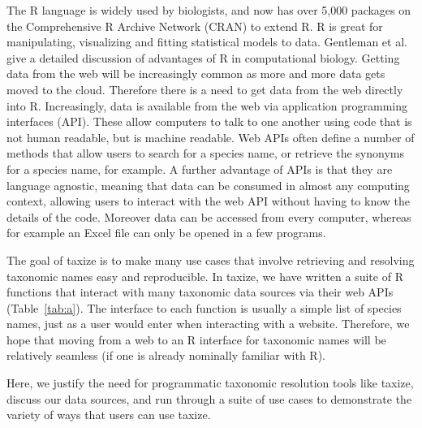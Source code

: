 \documentclass[10pt,a4paper,twocolumn]{article}\usepackage[]{graphicx}\usepackage[]{color}
\begin{document}
The R language is widely used by biologists, and now has over 5,000 packages on the Comprehensive R Archive Network (CRAN) to extend R. R is great for manipulating, visualizing and fitting statistical models to data. Gentleman et al. \cite{gentleman_bioconductor:_2004} give a detailed discussion of advantages of R in computational biology. Getting data from the web will be increasingly common as more and more data gets moved to the cloud. Therefore there is a need to get data from the web directly into R. Increasingly, data is available from the web via application programming interfaces (API). These allow computers to talk to one another using code that is not human readable, but is machine readable. Web APIs often define a number of methods that allow users to search for a species name, or retrieve the synonyms for a species name, for example. A further advantage of APIs is that they are language agnostic, meaning that data can be consumed in almost any computing context, allowing users to interact with the web API without having to know the details of the code. Moreover data can be accessed from every computer, whereas for example an Excel file can only be opened in a few programs. 

The goal of taxize is to make many use cases that involve retrieving and resolving taxonomic names easy and reproducible. In taxize, we have written a suite of R functions that interact with many taxonomic data sources via their web APIs (Table~\ref{tab:a}). The interface to each function is usually a simple list of species names, just as a user would enter when interacting with a website. Therefore, we hope that moving from a web to an R interface for taxonomic names will be relatively seamless (if one is already nominally familiar with R). 

Here, we justify the need for programmatic taxonomic resolution tools like taxize, discuss our data sources, and run through a suite of use cases to demonstrate the variety of ways that users can use taxize.
\end{document}
